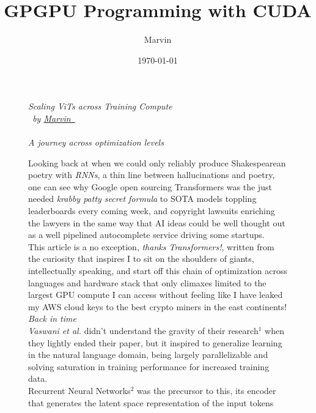 \documentclass[12pt]{article}
\begin{document}

\linespread{1.2}\selectfont
\title{GPGPU Programming with CUDA}
\author{Marvin}
\date{\today}
\begin{figure}[!htb]
    \begin{minipage}[t]{0.65\textwidth}
    {\sffamily 
    \fontsize{21}{8}\textcolor{xtitle}{\textit{Scaling ViTs across Training Compute}}\\
    \fontsize{9}{8}\textcolor{xtitle}{\textit{\ by \href{https://www.linkedin.com/in/marvin-mboya-b7bb81195/}{Marvin\ \faLinkedinSquare}}}\\
    }\\
    [-0.3cm]
    \textcolor{xtitle}{{\it A journey across optimization levels}}\\
    [0.2cm]
    \normalsize
    \raggedright
    Looking back at when we could only reliably produce Shakespearean poetry with {\it RNNs}, a thin line between hallucinations 
    and poetry, one can see why Google open sourcing Transformers was the just needed {\it krabby patty secret formula} to SOTA 
    models toppling leaderboards every coming week, and copyright lawsuits enriching the lawyers in the same way that AI ideas 
    could be well thought out as a well pipelined autocomplete service driving some startups.\\ 
    This article is a no exception, {\it thanks Transformers!}, written from the curiosity that inspires I to 
    sit on the shoulders of giants, intellectually speaking, and start off this chain of optimization across languages and hardware 
    stack that only climaxes limited to the largest GPU compute I can access without feeling like I have leaked my AWS cloud keys 
    to the best crypto miners in the east continents!
    \vspace{1.5em}\\
    \fontsize{14}{8}\textcolor{xtitle}{\textit{Back in time}}\\
    {\it Vaswani et al.} didn't understand the gravity of their research$^1$ when they lightly ended their paper, but 
    it inspired to generalize learning in the natural language domain, being largely parallelizable and solving saturation in 
    training performance for increased training data.\\
    Recurrent Neural Networks$^2$ was the precursor to this, its encoder that generates the latent space representation of the input tokens

\end{minipage}
\end{figure}
\end{document}
